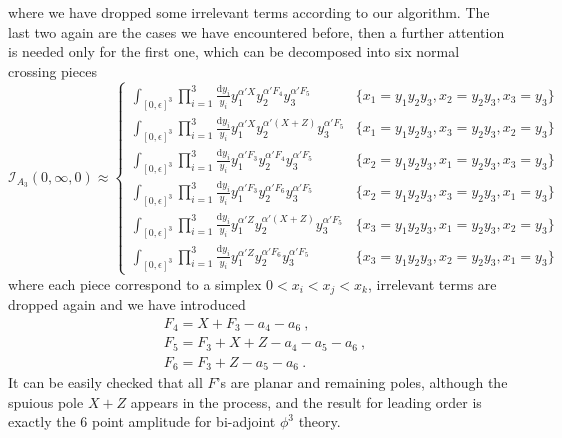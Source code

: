 \documentclass[12pt]{article}
\theoremstyle{definition}
\theoremstyle{plain}
\newcommand{\dif}{\mathrm{d}} %
\begin{document}
where we have dropped some irrelevant terms according to our algorithm. The last two again are the cases we have encountered before, then a further attention is needed only for the first one, which can be decomposed into six normal crossing pieces 
\begin{equation*}
	\mathcal{I}_{A_{3}}(0,\infty,0)\approx
	\begin{cases}
		\int_{[0,\epsilon]^{3}}\prod_{i=1}^{3}\frac{\dif y_{i}}{y_{i}} y_{1}^{\alpha'X} y_{2}^{\alpha' F_{4}}
		y_{3}^{\alpha'F_{5} }  & \{x_{1}=y_{1}y_{2}y_{3}, x_{2}=y_{2}y_{3},x_{3}=y_{3}\} \\
		\int_{[0,\epsilon]^{3}}\prod_{i=1}^{3}\frac{\dif y_{i}}{y_{i}} y_{1}^{\alpha'X} y_{2}^{\alpha' (X+Z)}
		y_{3}^{\alpha'F_{5} }  & \{x_{1}=y_{1}y_{2}y_{3}, x_{3}=y_{2}y_{3},x_{2}=y_{3}\}  \\
		\int_{[0,\epsilon]^{3}}\prod_{i=1}^{3}\frac{\dif y_{i}}{y_{i}} y_{1}^{\alpha' F_{3}} y_{2}^{\alpha' F_{4}}
		y_{3}^{\alpha'F_{5} }  & \{x_{2}=y_{1}y_{2}y_{3}, x_{1}=y_{2}y_{3},x_{3}=y_{3}\}  \\
		\int_{[0,\epsilon]^{3}}\prod_{i=1}^{3}\frac{\dif y_{i}}{y_{i}} y_{1}^{\alpha' F_{3}} y_{2}^{\alpha' F_{6}}
		y_{3}^{\alpha'F_{5} }  & \{x_{2}=y_{1}y_{2}y_{3}, x_{3}=y_{2}y_{3},x_{1}=y_{3}\}  \\
		\int_{[0,\epsilon]^{3}}\prod_{i=1}^{3}\frac{\dif y_{i}}{y_{i}} y_{1}^{\alpha' Z} y_{2}^{\alpha' (X+Z)}
		y_{3}^{\alpha'F_{5} }  & \{x_{3}=y_{1}y_{2}y_{3}, x_{1}=y_{2}y_{3},x_{2}=y_{3}\}  \\
		\int_{[0,\epsilon]^{3}}\prod_{i=1}^{3}\frac{\dif y_{i}}{y_{i}} y_{1}^{\alpha' Z} y_{2}^{\alpha' F_{6}}
		y_{3}^{\alpha'F_{5} }  & \{x_{3}=y_{1}y_{2}y_{3}, x_{2}=y_{2}y_{3},x_{1}=y_{3}\}  
	\end{cases}
\end{equation*}
where each piece correspond to a simplex $0<x_{i}<x_{j}<x_{k}$, irrelevant terms are dropped again and we have introduced
\begin{align*}
	&F_{4}=X+F_{3}-a_{4}-a_{6} \:, \\
	&F_{5}=F_{3}+X+Z-a_{4}-a_{5}-a_{6} \:, \\
	&F_{6}=F_{3}+Z-a_{5}-a_{6} \:.
\end{align*}
It can be easily checked that all $F$'s are planar and remaining poles, although the spuious pole $X+Z$ appears in the process, and the result for leading order is exactly the 6 point amplitude for bi-adjoint $\phi^{3}$ theory.
\end{document}
